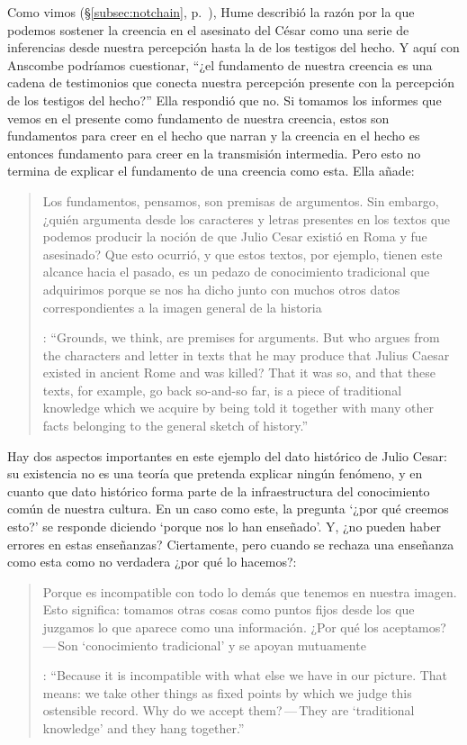 Como vimos (\S\ref{subsec:notchain}, p.~\pageref{subsec:notchain}), Hume describió la razón por la que podemos sostener la creencia en el asesinato del César como una serie de inferencias desde nuestra percepción hasta la de los testigos del hecho.
Y aquí con Anscombe podríamos cuestionar, \enquote{¿el fundamento de nuestra creencia es una cadena de testimonios que conecta nuestra percepción presente con la percepción de los testigos del hecho?} Ella respondió que no. Si tomamos los informes que vemos en el presente como fundamento de nuestra creencia, estos son fundamentos para creer en el hecho que narran y la creencia en el hecho es entonces fundamento para creer en la transmisión intermedia. Pero esto no termina de explicar el fundamento de una creencia como esta. Ella añade: \blockquote[{\cite[182]{anscombe2015logic:grounds}}: \enquote{Grounds, we think, are premises for arguments. But who argues from the characters and letter in texts that he may produce that Julius Caesar existed in ancient Rome and was killed? That it was so, and that these texts, for example, go back so-and-so far, is a piece of traditional knowledge which we acquire by being told it together with many other facts belonging to the general sketch of history.}]{Los fundamentos, pensamos, son premisas de argumentos. Sin embargo, ¿quién argumenta desde los caracteres y letras presentes en los textos que podemos producir la noción de que Julio Cesar existió en Roma y fue asesinado? Que esto ocurrió, y que estos textos, por ejemplo, tienen este alcance hacia el pasado, es un pedazo de conocimiento tradicional que adquirimos porque se nos ha dicho junto con muchos otros datos correspondientes a la imagen general de la historia}. Hay dos aspectos importantes en este ejemplo del dato histórico de Julio Cesar: su existencia no es una teoría que pretenda explicar ningún fenómeno, y en cuanto que dato histórico forma parte de la infraestructura del conocimiento común de nuestra cultura. En un caso como este, la pregunta \enquote*{¿por qué creemos esto?} se responde diciendo \enquote*{porque nos lo han enseñado}. Y, ¿no pueden haber errores en estas enseñanzas? Ciertamente, pero cuando se rechaza una enseñanza como esta como no verdadera ¿por qué lo hacemos?: \blockquote[{\cite[182]{anscombe2015logic:grounds}}: \enquote{Because it is incompatible with what else we have in our picture. That means: we take other things as fixed points by which we judge this ostensible record. Why do we accept them?\,---\,They are `traditional knowledge' and they hang together.}]{Porque es incompatible con todo lo demás que tenemos en nuestra imagen. Esto significa: tomamos otras cosas como puntos fijos desde los que juzgamos lo que aparece como una información. ¿Por qué los aceptamos?\,---\,Son `conocimiento tradicional' y se apoyan mutuamente}.


